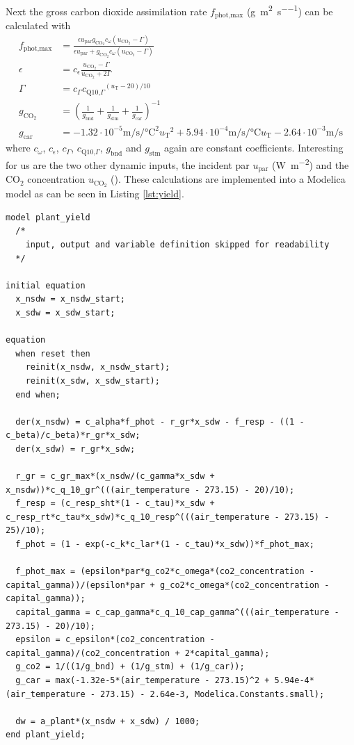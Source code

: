 Next the gross carbon dioxide assimilation rate $f_{\text{phot,max}}$ (\si{\g\per\square\m\per\s}) can be calculated with
\begin{align*}
  f_{\text{phot,max}} &= \frac{\epsilon u_{\text{par}} g_{\text{CO}_2} c_\omega (u_{\text{CO}_2} -\Gamma)}{\epsilon u_{\text{par}} + g_{\text{CO}_2} c_\omega (u_{\text{CO}_2} -\Gamma)}\\
  \epsilon &= c_\epsilon \frac{u_{\text{CO}_2} - \Gamma}{u_{\text{CO}_2} + 2\Gamma}\\
  \Gamma &= c_\Gamma {c_{\text{Q10,}\Gamma}}^{(u_\text{T}-20)/10}\\
  g_{\text{CO}_2} &= \left(\frac{1}{g_{\text{bnd}}} + \frac{1}{g_{\text{stm}}} + \frac{1}{g_{\text{car}}}\right)^{-1}\\
  g_{\text{car}} &= -1.32 \cdot 10^{-5} \si{\m\per\s\per\square\degreeCelsius} {u_\text{T}}^2 + 5.94 \cdot 10^{-4} \si{\m\per\s\per\degreeCelsius} u_\text{T} - 2.64 \cdot 10^{-3} \si{\m\per\s}
\end{align*}
where $c_\omega$, $c_\epsilon$, $c_\Gamma$, $c_{\text{Q10,}\Gamma}$, $g_{\text{bnd}}$ and $g_{\text{stm}}$ again are constant coefficients.
Interesting for us are the two other dynamic inputs, the incident \ac{par} $u_\text{par}$ (\si{\W\per\square\m}) and the CO$_2$ concentration $u_{\text{CO}_2}$ (\si{\ppm}).
These calculations are implemented into a Modelica model as can be seen in Listing \ref{lst:yield}.

\begin{lstlisting}[basicstyle=\fontsize{9pt}{10.5pt}\ttfamily, caption={Modelica model for lettuce yields per \si{\square\m}}, label=lst:yield]
model plant_yield
  /*
    input, output and variable definition skipped for readability
  */

initial equation
  x_nsdw = x_nsdw_start;
  x_sdw = x_sdw_start;

equation
  when reset then
    reinit(x_nsdw, x_nsdw_start);
    reinit(x_sdw, x_sdw_start);
  end when;

  der(x_nsdw) = c_alpha*f_phot - r_gr*x_sdw - f_resp - ((1 - c_beta)/c_beta)*r_gr*x_sdw;
  der(x_sdw) = r_gr*x_sdw;

  r_gr = c_gr_max*(x_nsdw/(c_gamma*x_sdw + x_nsdw))*c_q_10_gr^(((air_temperature - 273.15) - 20)/10);
  f_resp = (c_resp_sht*(1 - c_tau)*x_sdw + c_resp_rt*c_tau*x_sdw)*c_q_10_resp^(((air_temperature - 273.15) - 25)/10);
  f_phot = (1 - exp(-c_k*c_lar*(1 - c_tau)*x_sdw))*f_phot_max;

  f_phot_max = (epsilon*par*g_co2*c_omega*(co2_concentration - capital_gamma))/(epsilon*par + g_co2*c_omega*(co2_concentration - capital_gamma));
  capital_gamma = c_cap_gamma*c_q_10_cap_gamma^(((air_temperature - 273.15) - 20)/10);
  epsilon = c_epsilon*(co2_concentration - capital_gamma)/(co2_concentration + 2*capital_gamma);
  g_co2 = 1/((1/g_bnd) + (1/g_stm) + (1/g_car));
  g_car = max(-1.32e-5*(air_temperature - 273.15)^2 + 5.94e-4*(air_temperature - 273.15) - 2.64e-3, Modelica.Constants.small);

  dw = a_plant*(x_nsdw + x_sdw) / 1000;
end plant_yield;
\end{lstlisting}

